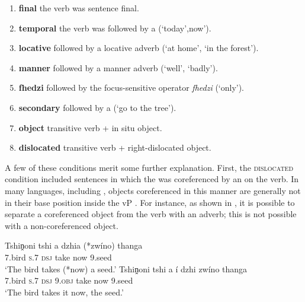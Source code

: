 \documentclass[output=paper,modfonts,nonflat,hidelinks]{langsci/langscibook}
\begin{document}
\begin{enumerate}
\item{}\textbf{final} the verb was sentence final.
\item{}\textbf{temporal} the verb was followed by a  (`today',now').
\item{}\textbf{locative} followed by a locative adverb (`at home', `in the forest').
\item{}\textbf{manner} followed by a manner adverb (`well', `badly').
\item{}\textbf{fhedzi} followed by the focus-sensitive operator \textit{fhedzi} (`only').
\item{}\textbf{secondary} followed by a  (`go to the tree').
\item{}\textbf{object} transitive verb + in situ object.
\item{}\textbf{dislocated} transitive verb + right-dislocated object.
\end{enumerate}

A few of these conditions merit some further explanation. First, the
\textsc{dislocated} condition included sentences in which the  was
coreferenced by an  on the verb. In many  languages,
including , objects coreferenced in this manner are generally not
in their base position inside the vP \citep{Buell2005}. For instance, as shown in
, it is possible to separate a coreferenced object from the verb with an
adverb; this is not possible with a non-coreferenced object.


\ea \label{ex:kusmer:insitu-demonstration}
\ea \gll Tshiṋoni tshi a dzhia (*zwíno) thanga\\
		  7.bird  \textsc{s.}7 \textsc{dsj} take now 9.seed\\
		\glt  `The bird takes (*now) a seed.'
  \ex \gll Tshiṋoni tshi a í dzhi zwíno thanga\\
		  7.bird  \textsc{s.}7 \textsc{dsj} 9\textsc{.obj} take now 9.seed\\
	 \glt `The bird takes it now, the seed.'
	 \z
 \z
\end{document}
